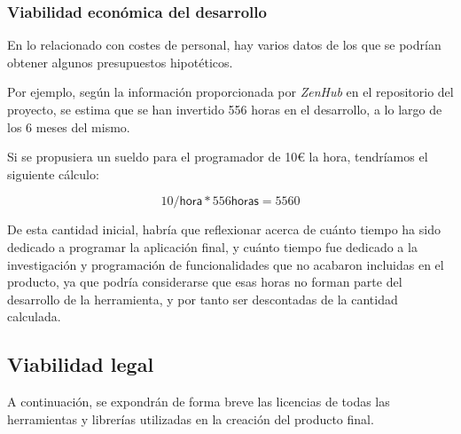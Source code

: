 \subsubsection{Viabilidad económica del desarrollo}

En lo relacionado con costes de personal, hay varios datos de los que se podrían obtener algunos presupuestos hipotéticos.

Por ejemplo, según la información proporcionada por \emph{ZenHub} en el repositorio del proyecto, se estima que se han invertido 556 horas en el desarrollo, a lo largo de los 6 meses del mismo.

Si se propusiera un sueldo para el programador de 10\euro{} la hora, tendríamos el siguiente cálculo:

\[10  /\textsf{hora} * 556 \textsf{horas} = 5560 \]

De esta cantidad inicial, habría que reflexionar acerca de cuánto tiempo ha sido dedicado a programar la aplicación final, y cuánto tiempo fue dedicado a la investigación y programación de funcionalidades que no acabaron incluidas en el producto, ya que podría considerarse que esas horas no forman parte del desarrollo de la herramienta, y por tanto ser descontadas de la cantidad calculada.

\subsection{Viabilidad legal}

A continuación, se expondrán de forma breve las licencias de todas las herramientas y librerías utilizadas en la creación del producto final.

